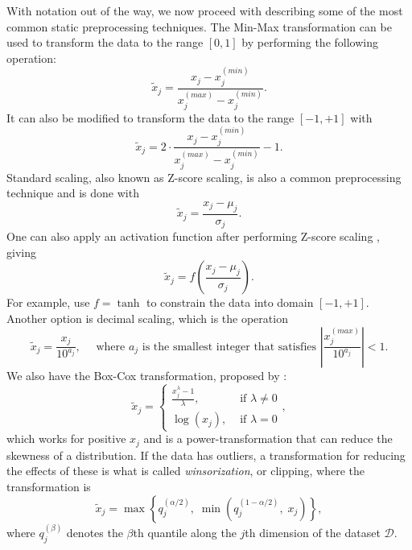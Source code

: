 \documentclass{statsmsc}
\begin{document}
{With notation out of the way, we now proceed with describing some of the most common
static preprocessing techniques.  The Min-Max transformation can be
used to transform the data to the range $[0, 1]$ by performing the following operation:
\begin{equation}\label{eq:pp1}
    \tilde{x}_j = \frac{x_j-x_j^{(min)}}{x_j^{(max)}-x_j^{(min)}} .
\end{equation}
It can also be modified to transform the data to the range $[-1,+1]$ with
\begin{equation}\label{eq:pp2}
    \tilde{x}_j = 2\cdot\frac{x_j-x_j^{(min)}}{x_j^{(max)}-x_j^{(min)}}-1.
\end{equation}
Standard scaling, also known as Z-score scaling, is also a common preprocessing technique and
is done with
\begin{equation}\label{eq:pp3}
    \tilde{x}_j=\frac{x_j-\mu_j}{\sigma_j}.
\end{equation}
One can also apply an activation function after performing Z-score scaling \citep{nawi},
giving
\begin{equation}\label{eq:pp4}
    \tilde{x}_j=f\left(\frac{x_j-\mu_j}{\sigma_j}\right).
\end{equation}
For example, \citeauthor{mixture_ct} use $f=\tanh$ to constrain the data into domain $[-1,+1]$.
Another option is decimal scaling, which is the operation
\begin{equation}\label{eq:pp5}
    \tilde{x}_j=\frac{x_j}{10^{a_j}}, \quad \textrm{ where } a_j
    \textrm{ is the smallest integer that satisfies }
        \left|\frac{x_j^{(max)}}{10^{a_j}}  \right|<1.
\end{equation}
We also have the Box-Cox transformation, proposed by \citeauthor{boxcox}:
\begin{equation}\label{eq:pp6}
    \tilde{x}_j=\left\{
        \begin{array}{ll}
            \frac{x_j^\lambda-1}{\lambda}, & \textrm{ if } \lambda \neq 0 \\
            \log(x_j), & \textrm{ if } \lambda=0
        \end{array}
    \right.,
\end{equation}
which works for positive $x_j$ and is a power-transformation that can reduce the skewness of
a distribution.  If the data has outliers, a transformation for reducing the effects of these
is what is called \textit{winsorization}, or clipping,
where the transformation is
\begin{equation}\label{eq:pp7}
    \tilde{x}_j=\max\left\{q_j^{(\alpha/2)},\;\min\left(q_j^{(1-\alpha/2)},\; x_j\right)\right\},
\end{equation}
where $q_j^{(\beta)}$ denotes the $\beta$th quantile along the $j$th dimension of the dataset
$\mathcal{D}$.

}
\end{document}
